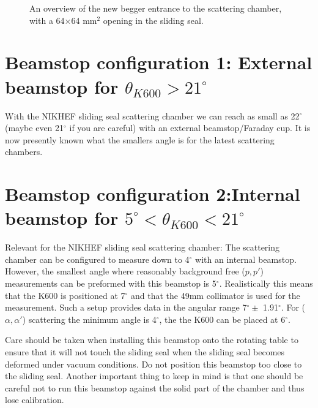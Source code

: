 \documentclass[11pt]{report}
\begin{document}
\begin{figure}[!ht]
\centerline{\vspace{0cm}\hspace{0cm}
}
\centering
\caption{An overview of the new begger entrance to the scattering chamber, with a 64$\times$64 mm$^2$
opening in the sliding seal.}
\label{fig:scatchamber-entry-new}
\end{figure} 








\section{Beamstop configuration 1: External beamstop for $\theta_{K600} > 21^{\circ}$}

With the NIKHEF sliding seal scattering chamber we can reach as small as
22$^{\circ}$ (maybe even 21$^{\circ}$ if you are careful) with an external beamstop/Faraday cup.
It is now presently known what the smallers angle is for the latest scattering chambers.



\section{Beamstop configuration 2:Internal beamstop for $5^{\circ}<\theta_{K600}<21^{\circ}$}

Relevant for the NIKHEF sliding seal scattering chamber:
The scattering chamber can be configured to measure down to 4$^{\circ}$ with an internal
beamstop.  
However, the smallest angle where reasonably background free ($p,p'$) 
measurements can be preformed with this beamstop 
is 5$^{\circ}$. Realistically this means that the K600 is positioned
at 7$^{\circ}$ and that the 49mm collimator is used for the measurement. Such a setup
provides data in the angular range 7$^{\circ} \pm$ 1.91$^{\circ}$.
For ($\alpha,\alpha '$) scattering the minimum angle is 4$^{\circ}$, the the K600
can be placed at 6$^{\circ}$.

Care should be taken when installing this beamstop onto the rotating table
to ensure that it will not touch the
sliding seal when the sliding seal becomes deformed under vacuum conditions.
Do not position this beamstop too close to the sliding seal. Another important thing
to keep in mind is that one should be careful not to run this beamstop against
the solid part of the chamber and thus lose calibration.
\end{document}
